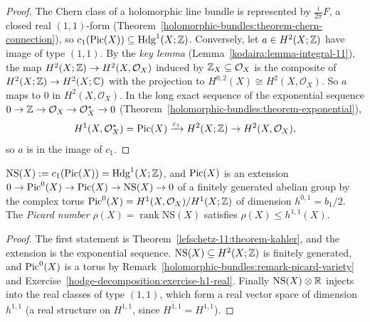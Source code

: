 \begin{proof}
The Chern class of a holomorphic line bundle is represented by $\frac{i}{2\pi}F$, a closed real $(1,1)$-form (Theorem~\ref{holomorphic-bundles:theorem-chern-connection}), so
$c_1(\operatorname{Pic}(X)) \subseteq \mathrm{Hdg}^1(X; \mathbb{Z})$. Conversely, let $a \in H^2(X; \mathbb{Z})$ have image of type $(1,1)$. By the \emph{key lemma} (Lemma~\ref{kodaira:lemma-integral-11}), the map
$H^2(X; \mathbb{Z}) \to H^2(X, \mathcal{O}_X)$ induced by $\mathbb{Z}_X \subseteq \mathcal{O}_X$ is the composite of $H^2(X; \mathbb{Z}) \to H^2(X; \mathbb{C})$ with the projection to $H^{0,2}(X) \cong H^2(X, \mathcal{O}_X)$.
So $a$ maps to $0$ in $H^2(X, \mathcal{O}_X)$. In the long exact sequence of the exponential sequence $0 \to \mathbb{Z} \to \mathcal{O}_X \to \mathcal{O}_X^* \to 0$
(Theorem~\ref{holomorphic-bundles:theorem-exponential}),
\[
H^1(X, \mathcal{O}_X^*) = \operatorname{Pic}(X) \xrightarrow{c_1} H^2(X; \mathbb{Z}) \to H^2(X, \mathcal{O}_X),
\]
so $a$ is in the image of $c_1$.
\end{proof}

\begin{corollary}\label{lefschetz-11:corollary-neron-severi}
$\mathrm{NS}(X) := c_1(\operatorname{Pic}(X)) = \mathrm{Hdg}^1(X; \mathbb{Z})$, and $\operatorname{Pic}(X)$ is an extension $0 \to \operatorname{Pic}^0(X) \to \operatorname{Pic}(X) \to \mathrm{NS}(X) \to 0$ of a finitely generated abelian group by the complex torus
$\operatorname{Pic}^0(X) = H^1(X, \mathcal{O}_X)/H^1(X; \mathbb{Z})$ of dimension $h^{0,1} = b_1/2$. The \emph{Picard number} $\rho(X) = \operatorname{rank}\mathrm{NS}(X)$ satisfies $\rho(X) \leq h^{1,1}(X)$.
\end{corollary}

\begin{proof}
The first statement is Theorem~\ref{lefschetz-11:theorem-kahler}, and the extension is the exponential sequence. $\mathrm{NS}(X) \subseteq H^2(X; \mathbb{Z})$ is finitely generated, and
$\operatorname{Pic}^0(X)$ is a torus by Remark~\ref{holomorphic-bundles:remark-picard-variety} and Exercise~\ref{hodge-decomposition:exercise-h1-real}. Finally $\mathrm{NS}(X) \otimes \mathbb{R}$ injects into the real
classes of type $(1,1)$, which form a real vector space of dimension $h^{1,1}$ (a real structure on $H^{1,1}$, since $\overline{H^{1,1}} = H^{1,1}$).
\end{proof}

